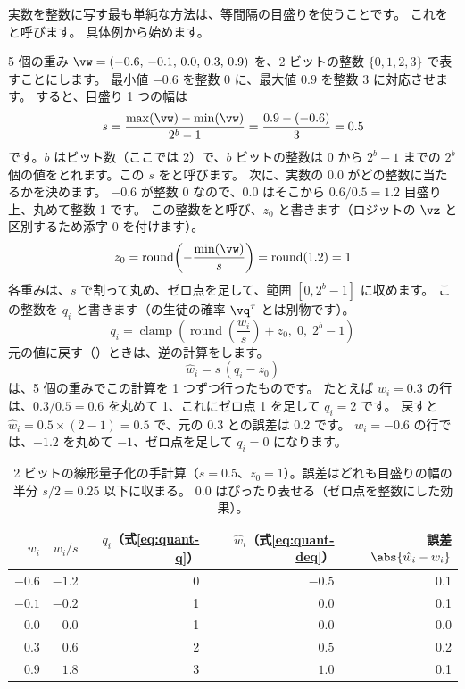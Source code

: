 実数を整数に写す最も単純な方法は、等間隔の目盛りを使うことです。
これをと呼びます\cite{jacob2018quantization}。
具体例から始めます。

5 個の重み $\vw=(-0.6,\,-0.1,\,0.0,\,0.3,\,0.9)$ を、2 ビットの整数 $\{0,1,2,3\}$ で表すことにします。
最小値 $-0.6$ を整数 0 に、最大値 $0.9$ を整数 3 に対応させます。
すると、目盛り 1 つの幅は
\begin{equation}
s=\frac{\max(\vw)-\min(\vw)}{2^b-1}=\frac{0.9-(-0.6)}{3}=0.5
\end{equation}
です。$b$ はビット数（ここでは 2）で、$b$ ビットの整数は $0$ から $2^b-1$ までの $2^b$ 個の値をとれます。この $s$ をと呼びます。
次に、実数の 0.0 がどの整数に当たるかを決めます。
$-0.6$ が整数 0 なので、0.0 はそこから $0.6/0.5=1.2$ 目盛り上、丸めて整数 1 です。
この整数をと呼び、$z_0$ と書きます（ロジットの $\vz$ と区別するため添字 0 を付けます）。
\begin{equation}
z_0=\operatorname{round}\!\left(-\frac{\min(\vw)}{s}\right)=\operatorname{round}(1.2)=1
\end{equation}
各重みは、$s$ で割って丸め、ゼロ点を足して、範囲 $[0, 2^b-1]$ に収めます。
この整数を $q_i$ と書きます（の生徒の確率 $\vq^\tau$ とは別物です）。
\begin{equation}
q_i=\operatorname{clamp}\!\left(\operatorname{round}\!\left(\frac{w_i}{s}\right)+z_0,\;0,\;2^b-1\right)
\label{eq:quant-q}
\end{equation}
元の値に戻す（）ときは、逆の計算をします。
\begin{equation}
\hat w_i=s\,(q_i-z_0)
\label{eq:quant-deq}
\end{equation}
は、5 個の重みでこの計算を 1 つずつ行ったものです。
たとえば $w_i=0.3$ の行は、$0.3/0.5=0.6$ を丸めて 1、これにゼロ点 1 を足して $q_i=2$ です。
戻すと $\hat w_i=0.5\times(2-1)=0.5$ で、元の 0.3 との誤差は 0.2 です。
$w_i=-0.6$ の行では、$-1.2$ を丸めて $-1$、ゼロ点を足して $q_i=0$ になります。

\begin{table}[tbp]
\centering
\caption{2 ビットの線形量子化の手計算（$s=0.5$、$z_0=1$）。誤差はどれも目盛りの幅の半分 $s/2=0.25$ 以下に収まる。
0.0 はぴったり表せる（ゼロ点を整数にした効果）。}
\label{tab:quant-example}
\begin{tabular}{rrrrr}
\toprule
$w_i$ & $w_i/s$ & $q_i$（式\eqref{eq:quant-q}） & $\hat w_i$（式\eqref{eq:quant-deq}） & 誤差 $\abs{\hat w_i-w_i}$ \\
\midrule
$-0.6$ & $-1.2$ & 0 & $-0.5$ & 0.1 \\
$-0.1$ & $-0.2$ & 1 & $0.0$ & 0.1 \\
$0.0$ & $0.0$ & 1 & $0.0$ & 0.0 \\
$0.3$ & $0.6$ & 2 & $0.5$ & 0.2 \\
$0.9$ & $1.8$ & 3 & $1.0$ & 0.1 \\
\bottomrule
\end{tabular}
\end{table}


